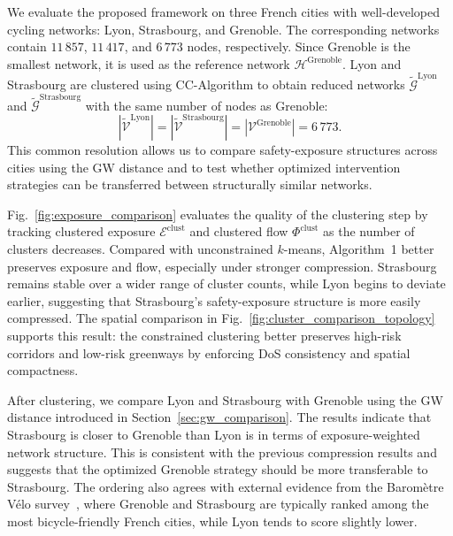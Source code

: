 \documentclass[lettersize,journal]{IEEEtran}
\begin{document}


We evaluate the proposed framework on three French cities with well-developed
cycling networks: Lyon, Strasbourg, and Grenoble. The corresponding networks
contain $11\,857$, $11\,417$, and $6\,773$ nodes, respectively. Since Grenoble is
the smallest network, it is used as the reference network
$\mathcal{H}^{\mathrm{Grenoble}}$. Lyon and Strasbourg are clustered using
CC-Algorithm to obtain reduced networks
$\tilde{\mathcal{G}}^{\mathrm{Lyon}}$ and
$\tilde{\mathcal{G}}^{\mathrm{Strasbourg}}$ with the same number of nodes as
Grenoble:
\[
|\tilde{\mathcal{V}}^{\mathrm{Lyon}}|
=
|\tilde{\mathcal{V}}^{\mathrm{Strasbourg}}|
=
|\mathcal{V}^{\mathrm{Grenoble}}|
=
6\,773.
\]
This common resolution allows us to compare safety-exposure structures across
cities using the GW distance and to test whether optimized intervention
strategies can be transferred between structurally similar networks.

Fig.~\ref{fig:exposure_comparison} evaluates the quality of the clustering
step by tracking clustered exposure $\mathcal{E}^{\mathrm{clust}}$ and clustered
flow $\Phi^{\mathrm{clust}}$ as the number of clusters decreases. Compared with
unconstrained $k$-means, Algorithm~1 better preserves exposure and flow,
especially under stronger compression. Strasbourg remains stable over a wider
range of cluster counts, while Lyon begins to deviate earlier, suggesting that
Strasbourg's safety-exposure structure is more easily compressed. The spatial
comparison in Fig.~\ref{fig:cluster_comparison_topology} supports this result:
the constrained clustering better preserves high-risk corridors and low-risk
greenways by enforcing DoS consistency and spatial compactness.

After clustering, we compare Lyon and Strasbourg with Grenoble using the
GW distance introduced in Section~\ref{sec:gw_comparison}. The results indicate
that Strasbourg is closer to Grenoble than Lyon is in terms of exposure-weighted
network structure. This is consistent with the previous compression results and
suggests that the optimized Grenoble strategy should be more transferable to
Strasbourg. The ordering also agrees with external evidence from the
Baromètre Vélo survey~\cite{parlonsvelo}, where Grenoble and Strasbourg are
typically ranked among the most bicycle-friendly French cities, while Lyon tends
to score slightly lower.
\end{document}
